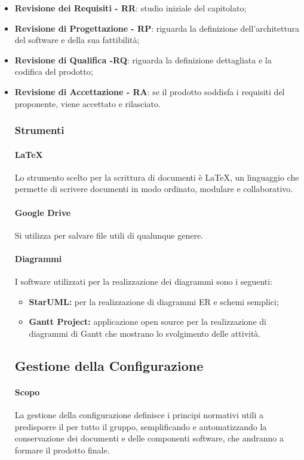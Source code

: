 				\begin{itemize}
				\item \textbf{Revisione dei Requisiti - RR}: studio iniziale del capitolato;
				\item \textbf{Revisione di Progettazione - RP}: riguarda la definizione dell'architettura del software e della sua fattibilità;
				\item \textbf{Revisione di Qualifica -RQ}: riguarda la definizione dettagliata e la codifica del prodotto;
				\item \textbf{Revisione di Accettazione - RA}: se il prodotto soddisfa i requisiti del proponente, viene accettato e rilasciato.
	\subsubsection{Strumenti}
			\paragraph{LaTeX}
			Lo strumento scelto per la scrittura di documenti è \LaTeX{}, un linguaggio che permette di scrivere documenti in modo ordinato, modulare e collaborativo.
			\paragraph{Google Drive}
			Si utilizza  per salvare file utili di qualunque genere.
			\paragraph{Diagrammi}
				I software utilizzati per la realizzazione dei diagrammi sono i seguenti:
				\begin{itemize}
					\item \textbf{StarUML:} per la realizzazione di diagrammi ER e schemi semplici;
					\item \textbf{Gantt Project:} applicazione open source per la realizzazione di diagrammi di Gantt che mostrano lo svolgimento delle attività.
				\end{itemize}
			
	\subsection{Gestione della Configurazione}
		\paragraph{Scopo}
			La gestione della configurazione definisce i principi normativi utili a predisporre il  per tutto il gruppo, semplificando e automatizzando la conservazione dei documenti e delle componenti software, che andranno a formare il prodotto finale.

\end{itemize}

